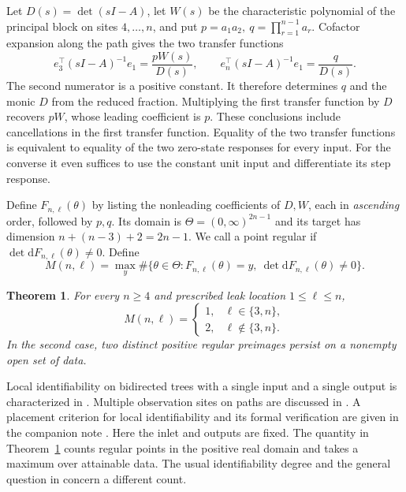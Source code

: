 \documentclass[11pt,a4paper]{article}
\newtheorem{theorem}{Theorem}
\newcommand{\dd}{\mathrm d}
\begin{document}
Let \(D(s)=\det(sI-A)\), let \(W(s)\) be the characteristic polynomial of
the principal block on sites \(4,\ldots,n\), and put
\(p=a_1a_2,\ q=\prod_{r=1}^{n-1}a_r\). Cofactor expansion along the path
gives the two transfer functions
\begin{equation}\label{eq:transfer}
 e_3^\top(sI-A)^{-1}e_1=\frac{pW(s)}{D(s)},\qquad
 e_n^\top(sI-A)^{-1}e_1=\frac{q}{D(s)} .
\end{equation}
The second numerator is a positive constant. It therefore determines \(q\)
and the monic \(D\) from the reduced fraction. Multiplying the first transfer
function by \(D\) recovers \(pW\), whose leading coefficient is \(p\).
These conclusions include cancellations in the first transfer function.
Equality of the two transfer functions is equivalent to equality of the two
zero-state responses for every input. For the converse it even suffices to
use the constant unit input and differentiate its step response.

Define \(F_{n,\ell}(\theta)\) by listing the nonleading coefficients of
\(D,W\), each in \emph{ascending} order, followed by \(p,q\). Its domain
is \(\Theta=(0,\infty)^{2n-1}\) and its target has dimension
\(n+(n-3)+2=2n-1\). We call a point regular if
\(\det \dd F_{n,\ell}(\theta)\ne0\). Define
\[
 M(n,\ell)=\max_y\#\{\theta\in\Theta:F_{n,\ell}(\theta)=y,\
                           \det\dd F_{n,\ell}(\theta)\ne0\}.
\]
\begin{theorem}\label{thm:main}
For every \(n\ge4\) and prescribed leak location \(1\le\ell\le n\),
\[
 M(n,\ell)=
 \begin{cases}
  1,&\ell\in\{3,n\},\\
  2,&\ell\notin\{3,n\}.
 \end{cases}
\]
In the second case, two distinct positive regular preimages persist on a
nonempty open set of data.
\end{theorem}

Local identifiability on bidirected trees with a single input and a single
output is characterized in \cite[Theorem~5.2]{bortner}. Multiple observation
sites on paths are discussed in \cite[\S6]{ahmed}. A placement criterion for
local identifiability and its formal verification are given in the companion
note \cite{placement}. Here the inlet and outputs are fixed. The quantity in
Theorem~\ref{thm:main} counts regular points in the positive real domain and
takes a maximum over attainable data. The usual identifiability degree and the
general question in \cite[Question~5.3]{meshkat} concern a different count.
\end{document}

